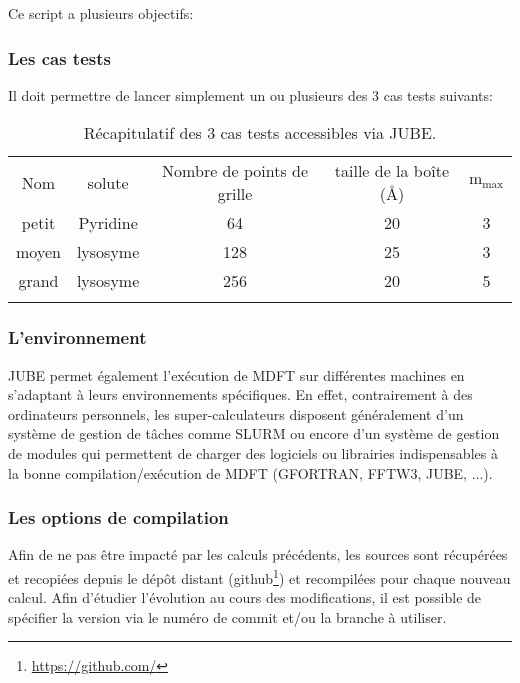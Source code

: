 Ce script a plusieurs objectifs:


\subsubsection{Les cas tests}
Il doit permettre de lancer simplement un ou plusieurs des 3 cas tests suivants:

\begin{table}[ht]
  \begin{center}
    \begin{tabular}{c c c c c}
      \hline & \\[-1em]\hline
      Nom & solute & Nombre de points de grille & taille de la boîte (\AA) & $\mathrm{m}_\mathrm{max}$  \\
      \hline
      petit & Pyridine & 64 & 20 & 3  \\
      moyen & lysosyme & 128 & 25 & 3  \\
      grand & lysosyme & 256 & 20 & 5  \\
      \hline & \\[-1em]\hline%
    \end{tabular}
  \end{center}
  \caption{Récapitulatif des 3 cas tests accessibles via JUBE.}
  \label{tab:JUBE_bench_cases}  
\end{table}


\subsubsection{L'environnement}
JUBE permet également l’exécution de MDFT sur différentes machines en s'adaptant à leurs environnements spécifiques. En effet, contrairement à des ordinateurs personnels, les super-calculateurs disposent généralement d'un système de gestion de tâches comme SLURM ou encore d'un système de gestion de modules qui permettent de charger des logiciels ou librairies indispensables à la bonne compilation/exécution de MDFT (GFORTRAN, FFTW3, JUBE, ...).


\subsubsection{Les options de compilation}
Afin de ne pas être impacté par les calculs précédents, les sources sont récupérées et recopiées depuis le dépôt distant (github\footnote{\url{https://github.com/}}) et recompilées pour chaque nouveau calcul. Afin d'étudier l'évolution au cours des modifications, il est possible de spécifier la version via le numéro de commit et/ou la branche à utiliser.

